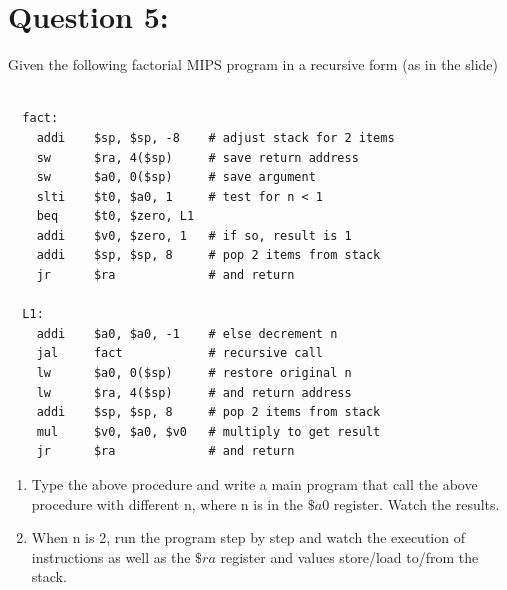 \documentclass[12pt,a4paper]{article}
\begin{document}
\section*{Question 5:}
Given the following factorial MIPS program in a recursive form (as in the slide)
\begin{mdframed}[hidealllines=true,backgroundcolor=magenta!10]
  \begin{lstlisting}

  fact:
    addi    $sp, $sp, -8    # adjust stack for 2 items
    sw      $ra, 4($sp)     # save return address
    sw      $a0, 0($sp)     # save argument
    slti    $t0, $a0, 1     # test for n < 1
    beq     $t0, $zero, L1
    addi    $v0, $zero, 1   # if so, result is 1
    addi    $sp, $sp, 8     # pop 2 items from stack
    jr      $ra             # and return

  L1:
    addi    $a0, $a0, -1    # else decrement n
    jal     fact            # recursive call
    lw      $a0, 0($sp)     # restore original n
    lw      $ra, 4($sp)     # and return address
    addi    $sp, $sp, 8     # pop 2 items from stack
    mul     $v0, $a0, $v0   # multiply to get result
    jr      $ra             # and return

    \end{lstlisting}
\end{mdframed}
\begin{enumerate}
  \item Type the above procedure and write a main program that call the above procedure with different n, where n is in the \(\$a0\) register. Watch the results.
  \item When n is 2, run the program step by step and watch the execution of instructions as well as the \(\$ra\) register and values store/load to/from the stack.
\end{enumerate}
\end{document}
